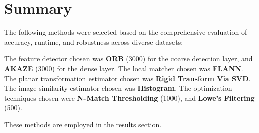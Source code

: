 \vspace{-0.5cm}
\section{Summary}
\vspace{-0.25cm}
The following methods were selected based on the comprehensive evaluation of accuracy, runtime, and robustness across diverse datasets:


The feature detector chosen was \textbf{ORB} (3000) for the coarse detection layer, and \textbf{AKAZE} (3000) for the dense layer. The local matcher chosen was \textbf{FLANN}. The planar transformation estimator chosen was \textbf{Rigid Transform Via SVD}. The image similarity estimator chosen was \textbf{Histogram}. The optimization techniques chosen were \textbf{N-Match Thresholding} (1000), and \textbf{Lowe's Filtering} (500). 

These methods are employed in the results section. 